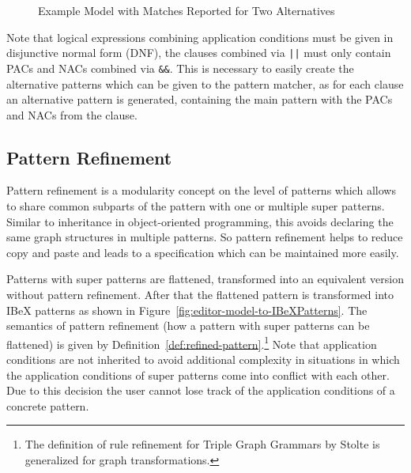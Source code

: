 \begin{figure}[h!]
	\centering
	\caption{Example Model with Matches Reported for Two Alternatives}
	\label{fig:example-model-duplicate-matches}
\end{figure}

\noindent
Note that logical expressions combining application conditions must be given in disjunctive normal form (DNF), \ie the clauses combined via \texttt{||} must only contain PACs and NACs combined via \texttt{\&\&}.
This is necessary to easily create the alternative patterns which can be given to the pattern matcher, as for each clause an alternative pattern is generated, containing the main pattern with the PACs and NACs from the clause.

\subsection{Pattern Refinement}
\label{pattern-refinement}
Pattern refinement is a modularity concept on the level of patterns which allows to share common subparts of the pattern with one or multiple super patterns.
Similar to inheritance in object-oriented programming, this avoids declaring the same graph structures in multiple patterns.
So pattern refinement helps to reduce copy and paste and leads to a specification which can be maintained more easily.

Patterns with super patterns are flattened, \ie transformed into an equivalent version without pattern refinement.
After that the flattened pattern is transformed into IBeX patterns as shown in Figure~\ref{fig:editor-model-to-IBeXPatterns}.
The semantics of pattern refinement (how a pattern with super patterns can be flattened) is given by Definition~\ref{def:refined-pattern}.\footnote{The definition of rule refinement for Triple Graph Grammars by Stolte \cite{ExploitingTheModularityOfTGGs} is generalized for graph transformations.}
Note that application conditions are not inherited to avoid additional complexity in situations in which the application conditions of super patterns come into conflict with each other.
Due to this decision the user cannot lose track of the application conditions of a concrete pattern.

